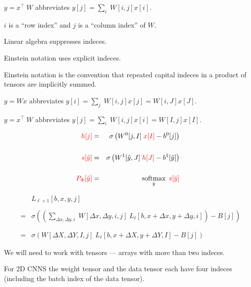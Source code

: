 {\vfill

$y = x^\top\;W$ \hfill abbreviates \hfill $y[j] = \sum_i \;W[i,j]x[i]$.

\vfill $i$ is a ``row index'' and $j$ is a ``column index'' of $W$.

\vfill
Linear algebra suppresses indeces.

\vfill
Einstein notation uses explicit indeces.


Einstein notation is the convention that repeated capital indeces in a product of tensors are implicitly summed.

\vfill
$y = Wx$ \hfill abbreviates \hfill $y[i] = \sum_j \;W[i,j]x[j] = W[i,J]x[J]$.

\vfill

$y = x^\top\;W$ \hfill abbreviates \hfill $y[j] = \sum_i \;W[i,j]x[i] = W[I,j]x[I]$.


\begin{eqnarray*}
  {\color{red} h[j]} & = & \sigma\left(W^0[j,I] \;{\color{red} x[I]} - b^0[j]\right) \\
  \\
  {\color{red} s[\hat{y}]} & = & \sigma\left(W^1[\hat{y},J]\;{\color{red} h[J]} - b^1[\hat{y}]\right) \\
  \\
  {\color{red} P_\Phi[\hat{y}]} & = & \operatorname*{softmax}_{\hat{y}}\;{\color{red} s[\hat{y}]}
\end{eqnarray*}


\begin{eqnarray*}
 & &  L_{{\ell+1}}[b,x,y,j] \\
 \\
 & = &   \sigma\left(\left(\sum_{\Delta x, \Delta y, i}\;W[\Delta x, \Delta y, i,j]\; L_{{\ell}}[b,x + \Delta x, y + \Delta y, i]\right) - B[j]\right) \\
 \\
 \\
  & = &   \sigma\left(W[\Delta X, \Delta Y, I,j]\; L_{{\ell}}[b,x + \Delta X, y + \Delta Y, I] - B[j]\right)
\end{eqnarray*}



We will need to work with tensors --- arrays with more than two indeces.

\vfill
For 2D CNNS the weight tensor and the data tensor each have four indeces (including the batch index of the data tensor).

}

